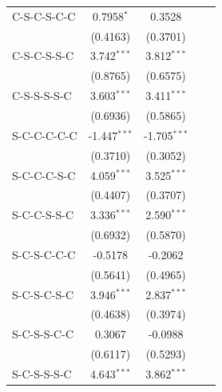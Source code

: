 \begin{table}[htbp]
\begin{tabular}{lcccc}
      C-S-C-S-C-C                     & 0.7958$^{*}$   & 0.3528         &                &   \\   
                                      & (0.4163)       & (0.3701)       &                &   \\   
      C-S-C-S-S-C                     & 3.742$^{***}$  & 3.812$^{***}$  &                &   \\   
                                      & (0.8765)       & (0.6575)       &                &   \\   
      C-S-S-S-S-C                     & 3.603$^{***}$  & 3.411$^{***}$  &                &   \\   
                                      & (0.6936)       & (0.5865)       &                &   \\   
      S-C-C-C-C-C                     & -1.447$^{***}$ & -1.705$^{***}$ &                &   \\   
                                      & (0.3710)       & (0.3052)       &                &   \\   
      S-C-C-C-S-C                     & 4.059$^{***}$  & 3.525$^{***}$  &                &   \\   
                                      & (0.4407)       & (0.3707)       &                &   \\   
      S-C-C-S-S-C                     & 3.336$^{***}$  & 2.590$^{***}$  &                &   \\   
                                      & (0.6932)       & (0.5870)       &                &   \\   
      S-C-S-C-C-C                     & -0.5178        & -0.2062        &                &   \\   
                                      & (0.5641)       & (0.4965)       &                &   \\   
      S-C-S-C-S-C                     & 3.946$^{***}$  & 2.837$^{***}$  &                &   \\   
                                      & (0.4638)       & (0.3974)       &                &   \\   
      S-C-S-S-C-C                     & 0.3067         & -0.0988        &                &   \\   
                                      & (0.6117)       & (0.5293)       &                &   \\   
      S-C-S-S-S-C                     & 4.643$^{***}$  & 3.862$^{***}$  &                &   \\   

\end{tabular}
\end{table}

